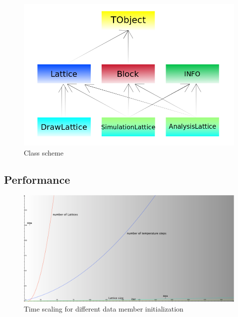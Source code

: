 \documentclass[11pt,a4paper]{article}
\begin{document}
\begin{figure}[h!]
  \centering
  \includegraphics[scale=0.45]{img/Schema_classi.png}
  \caption{Class scheme}
\end{figure}
\newpage







%   














\newpage
\appendix
\subsection*{Performance}
\begin{figure}[h!]
  \centering
   \includegraphics[width=\columnwidth]{img/Andamenti_performance.pdf} 
  \caption{Time scaling for different data member initialization}

\end{figure}
\end{document}
